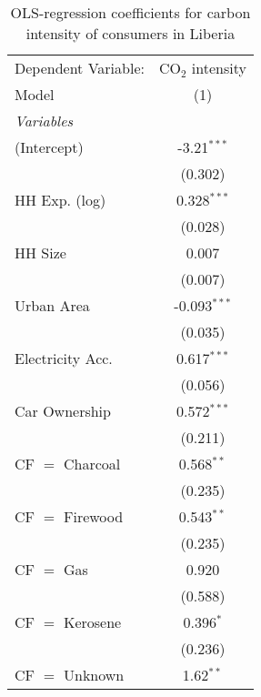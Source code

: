 
\begin{table}[htbp!]
   \centering
   \small
   \begin{adjustbox}{width = 1\textwidth, max height = 0.95\textheight, center}
      \begin{threeparttable}[b]
         \caption{\label{tab:OLS_1_LBR} OLS-regression coefficients for carbon intensity of consumers in Liberia}
         \begin{tabular}{lc}
            \tabularnewline \midrule \midrule
            Dependent Variable: & CO$_{2}$ intensity\\  
            Model               & (1)\\  
            \midrule
            \emph{Variables}\\
            (Intercept)         & -3.21$^{***}$\\   
                                & (0.302)\\   
            HH Exp. (log)       & 0.328$^{***}$\\   
                                & (0.028)\\   
            HH Size             & 0.007\\   
                                & (0.007)\\   
            Urban Area          & -0.093$^{***}$\\   
                                & (0.035)\\   
            Electricity Acc.    & 0.617$^{***}$\\   
                                & (0.056)\\   
            Car Ownership       & 0.572$^{***}$\\   
                                & (0.211)\\   
            CF $=$ Charcoal     & 0.568$^{**}$\\   
                                & (0.235)\\   
            CF $=$ Firewood     & 0.543$^{**}$\\   
                                & (0.235)\\   
            CF $=$ Gas          & 0.920\\   
                                & (0.588)\\   
            CF $=$ Kerosene     & 0.396$^{*}$\\   
                                & (0.236)\\   
            CF $=$ Unknown      & 1.62$^{**}$\\   

\end{tabular}
\end{threeparttable}
\end{adjustbox}
\end{table}
